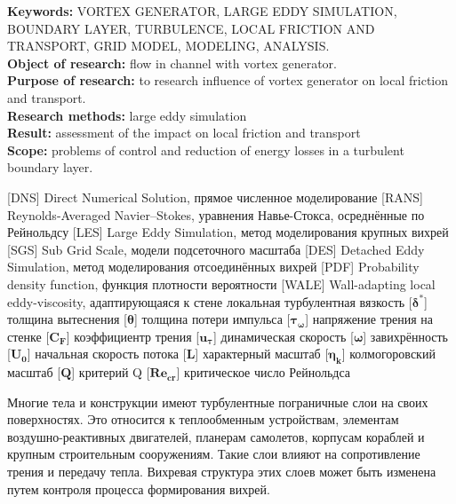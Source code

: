 \textbf{Keywords:} \MakeUppercase{vortex generator, large eddy simulation, boundary layer, turbulence, local friction and transport, grid model, modeling, analysis}.\\
\textbf{Object of research:} flow in channel with vortex generator.\\
\textbf{Purpose of research:} to research influence of vortex generator on local friction and transport.\\
\textbf{Research methods:} large eddy simulation\\
\textbf{Result:} assessment of the impact on local friction and transport\\
\textbf{Scope:} problems of control and reduction of energy losses in a turbulent boundary layer.\\
\newpage
{}
\begin{acronym}[RANS]
	   [DNS]   {Direct Numerical Solution, прямое численное моделирование}
	  [RANS]  {Reynolds-Averaged Navier–Stokes, уравнения Навье-Стокса, осреднённые по Рейнольдсу}
	   [LES]   {Large Eddy Simulation, метод моделирования крупных вихрей}
	   [SGS]   {Sub Grid Scale, модели подсеточного масштаба}
	   [DES]   {Detached Eddy Simulation, метод моделирования отсоединённых вихрей}
	   [PDF]   {Probability density function, функция плотности вероятности}
	  [WALE]  {Wall-adapting local eddy-viscosity, адаптирующаяся к стене локальная турбулентная вязкость}
	 [$\boldsymbol{\delta^*}$] {толщина вытеснения}
	 [$\boldsymbol{\theta}$] {толщина потери импульса}
	 [$\boldsymbol{\tau_\omega}$] {напряжение трения на стенке}
	 [$\boldsymbol{C_F}$] {коэффициентр трения}
	 [$\boldsymbol{u_\tau}$] {динамическая скорость}
	 [$\boldsymbol{\omega}$] {завихрённость}
	 [$\boldsymbol{U_0}$] {начальная скорость потока}
	  [$\boldsymbol{L}$] {характерный масштаб}
	 [$\boldsymbol{\eta_k}$] {колмогоровский масштаб}
	 [$\boldsymbol{Q}$] {критерий Q}
	 [$\boldsymbol{Re_{cr}}$] {критическое число Рейнольдса}
\end{acronym}
\newpage
{}
	
	‍Многие тела и конструкции имеют турбулентные пограничные слои на своих поверхностях. Это относится к теплообменным устройствам, элементам воздушно-реактивных двигателей, планерам самолетов, корпусам кораблей и крупным строительным сооружениям. Такие слои влияют на сопротивление трения и передачу тепла. Вихревая структура этих слоев может быть изменена путем контроля процесса формирования вихрей.
	
